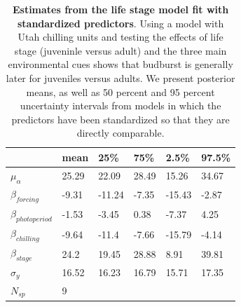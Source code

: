 \documentclass{article}
\begin{document}
\begin{footnotesize}
\begin{table}[ht]
\centering
\caption{\textbf{Estimates from the life stage model fit with standardized predictors}. Using a model with Utah chilling units and testing the effects of life stage (juveninle versus adult) and the three main environmental cues shows that budburst is generally later for juveniles versus adults. We present posterior means, as well as 50 percent and 95 percent uncertainty intervals from models in which the predictors have been standardized so that they are directly comparable.} 
\label{tab:stage}
\begingroup\footnotesize
\begin{tabular}{|p{}|p{}p{}p{}p{}p{}|}
  \hline
 & mean & 25\% & 75\% & 2.5\% & 97.5\% \\ 
  \hline
$\mu_{\alpha}$ & 25.29 & 22.09 & 28.49 & 15.26 & 34.67 \\ 
  $\beta_{forcing}$ & -9.31 & -11.24 & -7.35 & -15.43 & -2.87 \\ 
  $\beta_{photoperiod}$ & -1.53 & -3.45 & 0.38 & -7.37 & 4.25 \\ 
  $\beta_{chilling}$ & -9.64 & -11.4 & -7.66 & -15.79 & -4.14 \\ 
  $\beta_{stage}$ & 24.2 & 19.45 & 28.88 & 8.91 & 39.81 \\ 
  $\sigma_{y}$ & 16.52 & 16.23 & 16.79 & 15.71 & 17.35 \\ 
   \hline
$N_{sp}$ & 9 &  &  &  &  \\ 
   \hline
\end{tabular}
\endgroup
\end{table}


\end{footnotesize}
\end{document}
